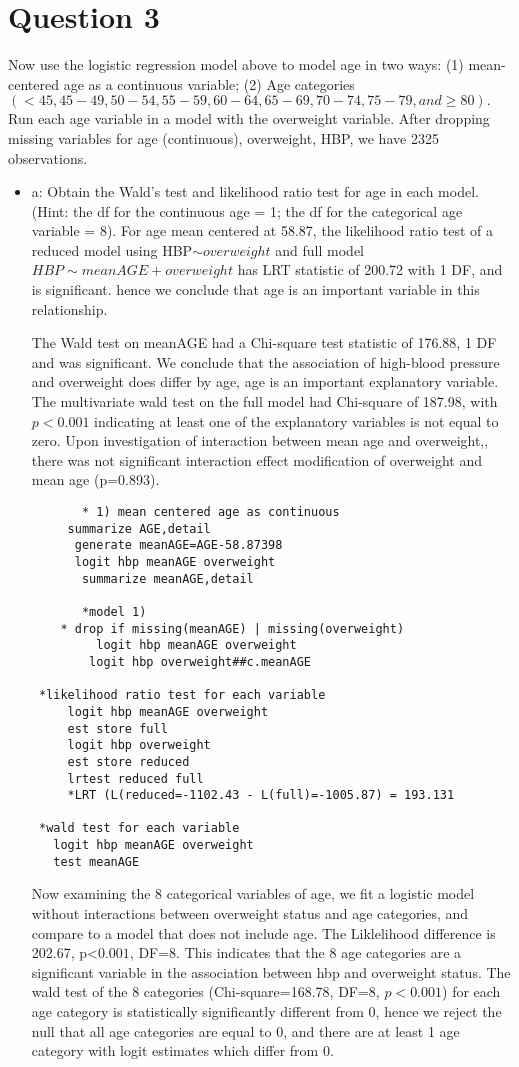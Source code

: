 \documentclass{article}
\begin{document}
\section{Question 3} 
Now use the logistic regression model above to model age in two ways: (1) mean-centered age as a continuous variable; (2) Age categories $(<45, 45-49, 50-54, 55-59, 60-64, 65-69, 70-74, 75-79, and \geq 80). $
Run each age variable in a model with the overweight variable.
 After dropping missing variables for age (continuous), overweight, HBP, we have 2325 observations.  
\begin{itemize}
    \item a: Obtain the Wald’s test and likelihood ratio test for age in each model.(Hint: the df for the continuous age = 1; the df for the categorical age variable = 8).
        For age mean centered at 58.87, the likelihood ratio test of a reduced model using HBP$\sim overweight$ and full model $HBP\sim meanAGE+ overweight$ has LRT statistic of 200.72 with 1 DF, and is significant. hence we conclude that age is an important variable in this relationship.
        
        
        The Wald test on meanAGE had a Chi-square test statistic of 176.88, 1 DF and was significant.  We conclude that the association of high-blood pressure and overweight does differ by age, age is an important explanatory variable. The multivariate wald test on the full model had Chi-square of 187.98, with $p<0.001$ indicating at least one of the explanatory variables is not equal to zero.
        Upon investigation of interaction between mean age and overweight,, there was not significant interaction effect modification of overweight and mean age (p=0.893).
        \begin{verbatim}
       * 1) mean centered age as continuous
	 summarize AGE,detail
	  generate meanAGE=AGE-58.87398
	  logit hbp meanAGE overweight
	   summarize meanAGE,detail
	   
	   *model 1) 
	* drop if missing(meanAGE) | missing(overweight)
	 	 logit hbp meanAGE overweight
	    logit hbp overweight##c.meanAGE	
	
 *likelihood ratio test for each variable
   	 logit hbp meanAGE overweight
	 est store full
	 logit hbp overweight
	 est store reduced
	 lrtest reduced full
	 *LRT (L(reduced=-1102.43 - L(full)=-1005.87) = 193.131
	 
 *wald test for each variable
   logit hbp meanAGE overweight
   test meanAGE
 \end{verbatim}
        Now examining the 8 categorical variables of age, we fit a logistic model without interactions between overweight status and age categories, and compare to a model that does not include age.  The Liklelihood difference is 202.67, p<$0.001$, DF=8. This indicates that the 8 age categories are a significant variable in the association between hbp and overweight status.
           The wald test of the 8 categories (Chi-square=168.78, DF=8, $p<0.001$) for each age category is statistically significantly different from 0, hence we reject the null that all age categories are equal to 0, and there are at least 1 age category with logit estimates which differ from 0.
      

\end{itemize}
\end{document}
